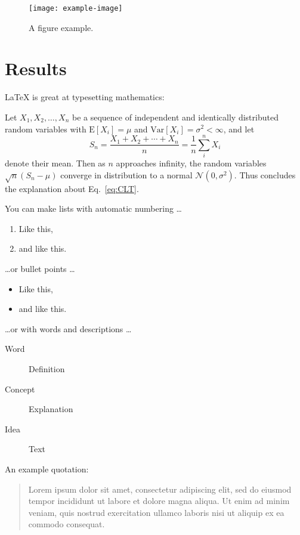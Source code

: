 \documentclass{biophys-new}
\begin{document}
\begin{figure}[hbt!]
\centering
\texttt{[image: example-image]}
\caption{A figure example.}
\label{fig:view}

\end{figure}

\section*{Results}

\LaTeX{} is great at typesetting mathematics:

Let $X_1, X_2, \ldots, X_n$ be a sequence of independent and identically distributed random variables with $\text{E}[X_i] = \mu$ and $\text{Var}[X_i] = \sigma^2 < \infty$, and let
\begin{equation}
\label{eq:CLT}
S_n = \frac{X_1 + X_2 + \cdots + X_n}{n}
      = \frac{1}{n}\sum_{i}^{n} X_i
\end{equation}
denote their mean. Then as $n$ approaches infinity, the random variables $\sqrt{n}(S_n - \mu)$ converge in distribution to a normal $\mathcal{N}(0, \sigma^2)$. Thus concludes the explanation about Eq.~\ref{eq:CLT}.


You can make lists with automatic numbering \dots

\begin{enumerate}
\item Like this,
\item and like this.
\end{enumerate}

\dots or bullet points \dots

\begin{itemize} 
\item Like this,
\item and like this.
\end{itemize}

\dots or with words and descriptions \dots

\begin{description}
\item[Word] Definition
\item[Concept] Explanation
\item[Idea] Text
\end{description}

An example quotation:

\begin{quote}
Lorem ipsum dolor sit amet, consectetur adipiscing elit, sed do eiusmod tempor incididunt ut labore et dolore magna aliqua. Ut enim ad minim veniam, quis nostrud exercitation ullamco laboris nisi ut aliquip ex ea commodo consequat.
\end{quote}
\end{document}
